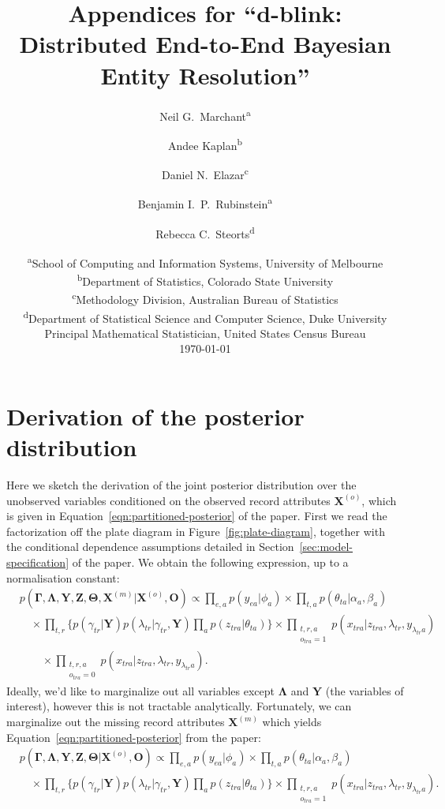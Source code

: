 \documentclass[12pt,letterpaper]{article}
\title{\bf Appendices for ``d-blink: Distributed End-to-End Bayesian Entity Resolution''}
\author{Neil G.~Marchant\textsuperscript{a} \and
	Andee Kaplan\textsuperscript{b} \and 
	Daniel N.~Elazar\textsuperscript{c} \and
	Benjamin I.~P.~Rubinstein\textsuperscript{a} \and 
	Rebecca C.~Steorts\textsuperscript{d}}
\date{
	\textsuperscript{a}School of Computing and Information Systems, University 
	of Melbourne\\
	\textsuperscript{b}Department of Statistics, Colorado State University\\
	\textsuperscript{c}Methodology Division, Australian Bureau of Statistics\\
	\textsuperscript{d}Department of Statistical Science and Computer Science, Duke University\\Principal Mathematical Statistician, United States Census Bureau\\[2ex]
	\today}
\renewcommand\vec{\bm}
\newcommand{\1}[1]{\mathbb{I}\!\left[#1\right]} %
\begin{document}
\maketitle

\newpage

\appendix
\section{Derivation of the posterior distribution}
\label{app-sec:full-posterior}
Here we sketch the derivation of the joint posterior distribution over the 
unobserved variables conditioned on the observed record attributes 
$\vec{X}^{(o)}$, which is given in 
Equation~\ref{eqn:partitioned-posterior} of the paper.
First we read the factorization off the plate diagram in 
Figure~\ref{fig:plate-diagram}, together with the conditional dependence 
assumptions detailed in Section~\ref{sec:model-specification} of the paper.
We obtain the following expression, up to a normalisation constant:
\begin{equation*}
\begin{split}
& p(\vec{\Gamma}, \vec{\Lambda}, \vec{Y}, \vec{Z}, \vec{\Theta}, \vec{X}^{(m)}|\vec{X}^{(o)}, \vec{O}) \propto 
  \prod_{e,a} p(y_{ea}|\phi_{a}) 
  \times \prod_{t,a} p(\theta_{ta}|\alpha_{a}, \beta_{a}) \\
& \quad {} \times 
  \prod_{t,r} \Big\{ p(\gamma_{tr}|\vec{Y})p(\lambda_{tr}|\gamma_{tr}, \vec{Y}) 
  \prod_{a} p(z_{tra}|\theta_{ta}) \Big\} 
  \times \prod_{\substack{t,r,a\\o_{tra}=1}} p(x_{tra}|z_{tra}, \lambda_{tr}, y_{\lambda_{tr}a}) \\
& \qquad {} \times 
  \prod_{\substack{t,r,a\\o_{tra}=0}} p(x_{tra}|z_{tra}, \lambda_{tr}, y_{\lambda_{tr}a}).
\end{split}
\end{equation*}
Ideally, we'd like to marginalize out all variables except $\vec{\Lambda}$ and 
$\vec{Y}$ (the variables of interest), however this is not tractable 
analytically.
Fortunately, we can marginalize out the missing record attributes 
$\vec{X}^{(m)}$ which yields Equation~\ref{eqn:partitioned-posterior} 
from the paper:
\begin{equation*}
\begin{split}
& p(\vec{\Gamma}, \vec{\Lambda}, \vec{Y}, \vec{Z}, \vec{\Theta}|\vec{X}^{(o)}, \vec{O}) \propto \prod_{e,a} p(y_{ea}|\phi_{a}) 
  \times \prod_{t,a} p(\theta_{ta}|\alpha_{a}, \beta_{a}) \\
& \quad {} \times 
  \prod_{t,r} \Big\{ p(\gamma_{tr}|\vec{Y})p(\lambda_{tr}|\gamma_{tr}, \vec{Y}) 
  \prod_{a} p(z_{tra}|\theta_{ta}) \Big\} 
  \times \prod_{\substack{t,r,a\\o_{tra}=1}} p(x_{tra}|z_{tra}, \lambda_{tr}, y_{\lambda_{tr}a}).
\end{split}
\end{equation*}
\end{document}
